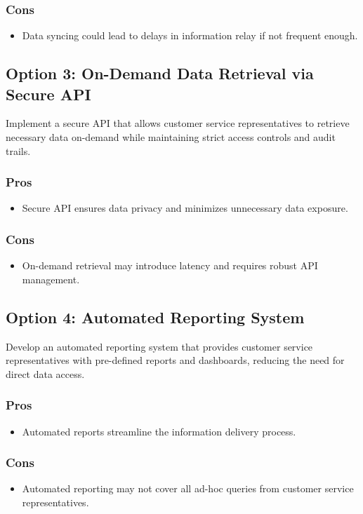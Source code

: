 \subsubsection*{Cons}
\begin{itemize}
    \item Data syncing could lead to delays in information relay if not frequent enough.
\end{itemize}

\subsection*{Option 3: On-Demand Data Retrieval via Secure API}
Implement a secure API that allows customer service representatives to retrieve necessary data on-demand while maintaining strict access controls and audit trails.
\subsubsection*{Pros}
\begin{itemize}
    \item Secure API ensures data privacy and minimizes unnecessary data exposure.
\end{itemize}
\subsubsection*{Cons}
\begin{itemize}
    \item On-demand retrieval may introduce latency and requires robust API management.
\end{itemize}

\subsection*{Option 4: Automated Reporting System}
Develop an automated reporting system that provides customer service representatives with pre-defined reports and dashboards, reducing the need for direct data access.
\subsubsection*{Pros}
\begin{itemize}
    \item Automated reports streamline the information delivery process.
\end{itemize}
\subsubsection*{Cons}
\begin{itemize}
    \item Automated reporting may not cover all ad-hoc queries from customer service representatives.
\end{itemize}

